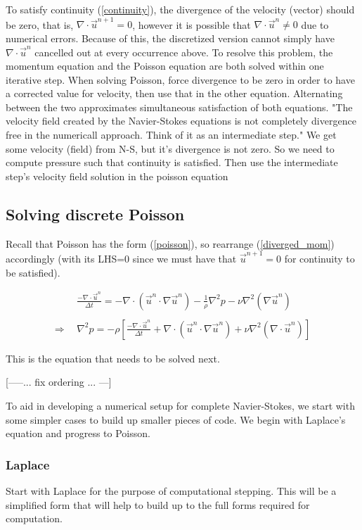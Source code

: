 \documentclass[11pt]{article}
\begin{document}
{To satisfy continuity (\ref{continuity}), the divergence of the velocity (vector) should
be zero, that is, $\nabla \cdot \vec{u}^{n+1}=0$, however it is
possible that $\nabla \cdot \vec{u}^n \neq 0$ due to numerical errors. Because of this,
the discretized version cannot simply have $\nabla \cdot \vec{u}^n$ cancelled out at
every occurrence above. To resolve this problem, the momentum equation and the Poisson
equation are both solved within one iterative step. When solving Poisson, force divergence
to be zero in order to have a corrected value for velocity, then use that in the other
equation. Alternating between the two approximates simultaneous satisfaction of both
equations. "The velocity field created by the Navier-Stokes equations is not completely
divergence free in the numericall approach. Think of it as an intermediate step."
We get some velocity (field) from N-S, but it's divergence is not zero. So we need to
compute pressure such that continuity is satisfied. Then use the intermediate step's velocity
field solution in the poisson equation

\subsection{Solving discrete Poisson}
Recall that Poisson has the form (\ref{poisson}), so rearrange (\ref{diverged_mom})
accordingly (with its LHS=0 since we must have that $\vec{u}^{n+1} = 0$ for continuity
to be satisfied).

\begin{align}
& \frac{- \nabla \cdot \vec{u}^n}{\Delta t}
	= - \nabla \cdot (\vec{u}^n \cdot \nabla \vec{u}^n)
	  - \frac{1}{\rho} \nabla^2 p
	  - \nu \nabla^2(\nabla \vec{u}^n)
														  \nonumber \\ \nonumber \\
\Rightarrow ~~&
\nabla^2 p = -\rho \left[
					\frac{ - \nabla \cdot \vec{u}^n}{\Delta t}
					+ \nabla \cdot (\vec{u}^n \cdot \nabla \vec{u}^n)
					+ \nu \nabla^2(\nabla \cdot \vec{u}^n)			\right]
\label{discrete_poisson_vector}
\end{align}

This is the equation that needs to be solved next.

[-----... fix ordering ... ---]

To aid in developing a numerical setup for complete Navier-Stokes, we start with some simpler
cases to build up smaller pieces of code. We begin with Laplace's equation and progress to
Poisson.

\subsubsection{Laplace}
Start with Laplace for the purpose of computational stepping. This will be a simplified form
that will help to build up to the full forms required for computation.

}
\end{document}
